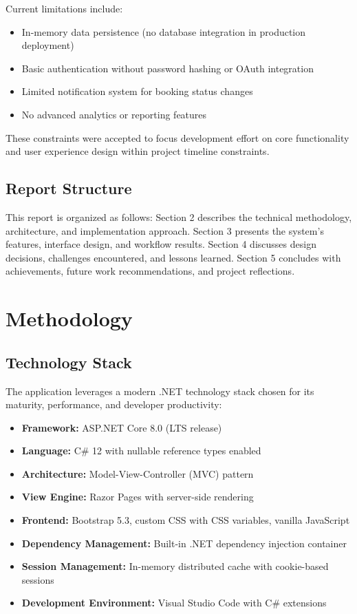\documentclass[12pt,a4paper]{article}
\begin{document}
Current limitations include:

\begin{itemize}[leftmargin=*]
    \item In-memory data persistence (no database integration in production deployment)
    \item Basic authentication without password hashing or OAuth integration
    \item Limited notification system for booking status changes
    \item No advanced analytics or reporting features
\end{itemize}

These constraints were accepted to focus development effort on core functionality and user experience design within project timeline constraints.

\subsection{Report Structure}

This report is organized as follows: Section 2 describes the technical methodology, architecture, and implementation approach. Section 3 presents the system's features, interface design, and workflow results. Section 4 discusses design decisions, challenges encountered, and lessons learned. Section 5 concludes with achievements, future work recommendations, and project reflections.

\newpage
\section{Methodology}

\subsection{Technology Stack}

The application leverages a modern .NET technology stack chosen for its maturity, performance, and developer productivity:

\begin{itemize}[leftmargin=*]
    \item \textbf{Framework:} ASP.NET Core 8.0 (LTS release)
    \item \textbf{Language:} C\# 12 with nullable reference types enabled
    \item \textbf{Architecture:} Model-View-Controller (MVC) pattern
    \item \textbf{View Engine:} Razor Pages with server-side rendering
    \item \textbf{Frontend:} Bootstrap 5.3, custom CSS with CSS variables, vanilla JavaScript
    \item \textbf{Dependency Management:} Built-in .NET dependency injection container
    \item \textbf{Session Management:} In-memory distributed cache with cookie-based sessions
    \item \textbf{Development Environment:} Visual Studio Code with C\# extensions
\end{itemize}
\end{document}
